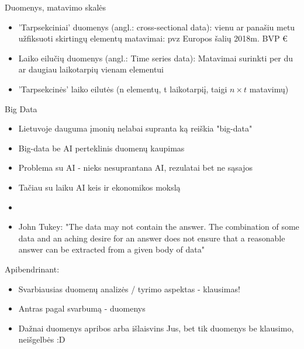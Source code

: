 \documentclass[11pt,xcolor=table]{beamer}
\begin{document}
\begin{frame}{Duomenys, matavimo skalės}
\begin{itemize}
\item 'Tarpsekciniai' duomenys (angl.: cross-sectional data): vienu ar panašiu metu užfiksuoti skirtingų elementų matavimai: pvz Europos šalių 2018m. BVP €
\item Laiko eilučių duomenys (angl.: Time series data): Matavimai surinkti per du ar daugiau laikotarpių vienam elementui
\item 'Tarpsekcinės' laiko eilutės (n elementų, t laikotarpiį, taigi $n \times t $ matavimų)
\end{itemize}
\end{frame}

\begin{frame}{Big Data}
\begin{itemize}
\item Lietuvoje dauguma įmonių nelabai supranta ką reiškia "big-data"
\item Big-data be AI perteklinis duomenų kaupimas
\item Problema su AI - nieks nesuprantana AI, rezulatai bet ne sąsajos
\item Tačiau su laiku AI keis ir ekonomikos mokslą
\item \href{https://www.aeaweb.org/webcasts/2019/aea-afa-joint-luncheon-impact-of-machine-learning}{\color{blue}{Video: AEA AFA Joint Luncheon - The Impact of Machine Learning on Econometrics and Economics}}
\item John Tukey: "The data may not contain the answer. The combination of some data and an aching desire for an answer does not ensure that a reasonable answer can be extracted from a given body of data" 
\end{itemize}
\end{frame}


\begin{frame}{Apibendrinant:}
\begin{itemize}
\item Svarbiausias duomenų analizės / tyrimo aspektas - klausimas!
\item Antras pagal svarbumą - duomenys
\item Dažnai duomenys apribos arba išlaisvins Jus, bet tik duomenys be klausimo, neišgelbės :D
\end{itemize}
\end{frame}
\end{document}
